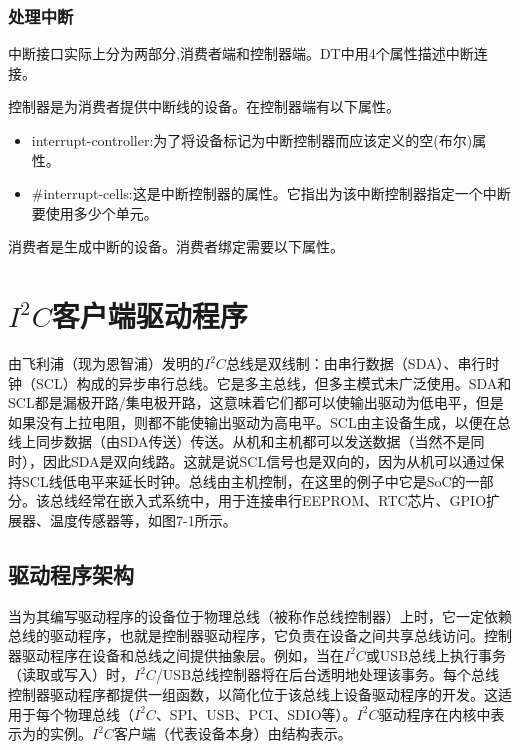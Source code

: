 \documentclass[lang=cn,newtx,10pt,scheme=chinese]{elegantbook}
\begin{document}
\subsection{处理中断}

中断接口实际上分为两部分,消费者端和控制器端。DT中用4个属性描述中断连接。

控制器是为消费者提供中断线的设备。在控制器端有以下属性。

\begin{itemize}
\item interrupt-controller:为了将设备标记为中断控制器而应该定义的空(布尔)属性。
\item \#interrupt-cells:这是中断控制器的属性。它指出为该中断控制器指定一个中断要使用多少个单元。
\end{itemize}

消费者是生成中断的设备。消费者绑定需要以下属性。



\chapter{$I^2C$客户端驱动程序}

由飞利浦（现为恩智浦）发明的$I^2C$总线是双线制：由串行数据（SDA）、串行时钟（SCL）构成的异步串行总线。它是多主总线，但多主模式未广泛使用。SDA和SCL都是漏极开路/集电极开路，这意味着它们都可以使输出驱动为低电平，但是如果没有上拉电阻，则都不能使输出驱动为高电平。SCL由主设备生成，以便在总线上同步数据（由SDA传送）传送。从机和主机都可以发送数据（当然不是同时），因此SDA是双向线路。这就是说SCL信号也是双向的，因为从机可以通过保持SCL线低电平来延长时钟。总线由主机控制，在这里的例子中它是SoC的一部分。该总线经常在嵌入式系统中，用于连接串行EEPROM、RTC芯片、GPIO扩展器、温度传感器等，如图7-1所示。

\section{驱动程序架构}

当为其编写驱动程序的设备位于物理总线（被称作总线控制器）上时，它一定依赖总线的驱动程序，也就是控制器驱动程序，它负责在设备之间共享总线访问。控制器驱动程序在设备和总线之间提供抽象层。例如，当在$I^2C$或USB总线上执行事务（读取或写入）时，$I^2C$/USB总线控制器将在后台透明地处理该事务。每个总线控制器驱动程序都提供一组函数，以简化位于该总线上设备驱动程序的开发。这适用于每个物理总线（$I^2C$、SPI、USB、PCI、SDIO等）。$I^2C$驱动程序在内核中表示为的实例。$I^2C$客户端（代表设备本身）由结构表示。
\end{document}

